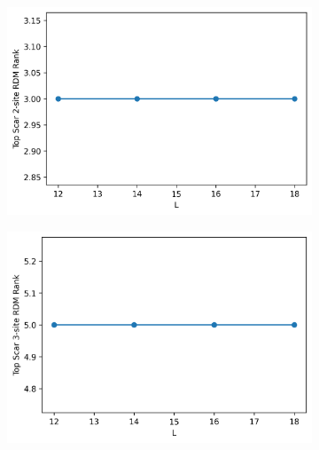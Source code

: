 \documentclass[11pt]{article}
\begin{document}
\begin{itemize}
\begin{itemize}
	\begin{figure}[H]
    \centering
    \begin{subfigure}{0.45\textwidth}
        \includegraphics[width=\linewidth]{dw_scar_2.png}
        \caption{}
        \label{fig:image1}
    \end{subfigure}
    \begin{subfigure}{0.45\textwidth}
        \includegraphics[width=\linewidth]{dw_scar_3.png}
        \caption{}
        \label{fig:image2}
    \end{subfigure}    %
    \begin{subfigure}{0.45\textwidth}

\end{subfigure}
\end{figure}
\end{itemize}
\end{itemize}
\end{document}
